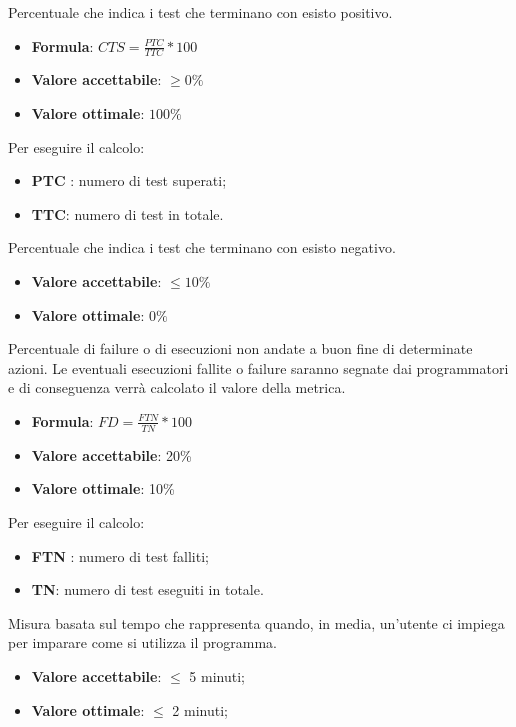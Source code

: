 Percentuale che indica i test che terminano con esisto positivo.
\begin{itemize}
    \item \textbf{Formula}: $CTS=\frac{PTC}{TTC}*100$
    \item \textbf{Valore accettabile}: $\geq0\%$
    \item \textbf{Valore ottimale}: $100\%$
\end{itemize}
Per eseguire il calcolo:
\begin{itemize}
    \item \textbf{PTC} : numero di test superati;
    \item \textbf{TTC}: numero di test in totale.
\end{itemize} 


Percentuale che indica i test che terminano con esisto negativo.
\begin{itemize}
    \item \textbf{Valore accettabile}: $\leq10\%$
    \item \textbf{Valore ottimale}: $0\%$
\end{itemize}


Percentuale di failure o di esecuzioni non andate a buon fine di determinate azioni. Le
eventuali esecuzioni fallite o failure saranno segnate dai programmatori e di conseguenza verrà calcolato
il valore della metrica.
\begin{itemize}
    \item \textbf{Formula}: $FD=\frac{FTN}{TN}*100$
    \item \textbf{Valore accettabile}: 20\%
    \item \textbf{Valore ottimale}: 10\%
\end{itemize}  
Per eseguire il calcolo:
\begin{itemize}
    \item \textbf{FTN} : numero di test falliti;
    \item \textbf{TN}: numero di test eseguiti in totale.
\end{itemize}

Misura basata sul tempo che rappresenta quando, in media, un'utente ci impiega per imparare come si utilizza il programma.
\begin{itemize}
    \item \textbf{Valore accettabile}: $\leq$ 5 minuti;
    \item \textbf{Valore ottimale}: $\leq$ 2 minuti;
\end{itemize}  

